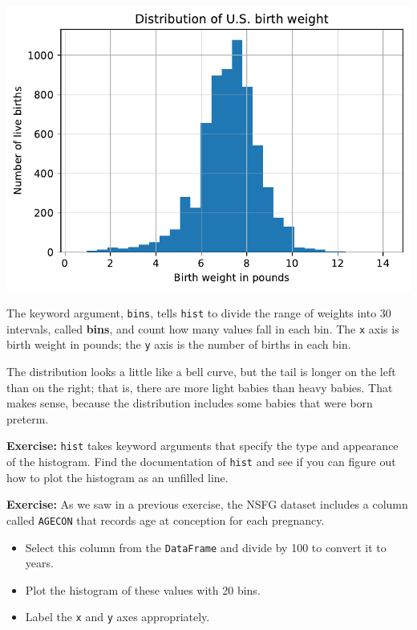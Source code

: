 \begin{center}
\includegraphics[scale=0.75]{chapters/07_dataframes_files/07_dataframes_60_0.pdf}
\end{center}

The keyword argument, \passthrough{\lstinline!bins!}, tells
\passthrough{\lstinline!hist!} to divide the range of weights into 30
intervals, called \textbf{bins}, and count how many values fall in each
bin. The \passthrough{\lstinline!x!} axis is birth weight in pounds; the
\passthrough{\lstinline!y!} axis is the number of births in each bin.

The distribution looks a little like a bell curve, but the tail is
longer on the left than on the right; that is, there are more light
babies than heavy babies. That makes sense, because the distribution
includes some babies that were born preterm.

\textbf{Exercise:} \passthrough{\lstinline!hist!} takes keyword
arguments that specify the type and appearance of the histogram. Find
the documentation of \passthrough{\lstinline!hist!} and see if you can
figure out how to plot the histogram as an unfilled line.

\textbf{Exercise:} As we saw in a previous exercise, the NSFG dataset
includes a column called \passthrough{\lstinline!AGECON!} that records
age at conception for each pregnancy.

\begin{itemize}
\item
  Select this column from the \passthrough{\lstinline!DataFrame!} and
  divide by 100 to convert it to years.
\item
  Plot the histogram of these values with 20 bins.
\item
  Label the \passthrough{\lstinline!x!} and \passthrough{\lstinline!y!}
  axes appropriately.
\end{itemize}

